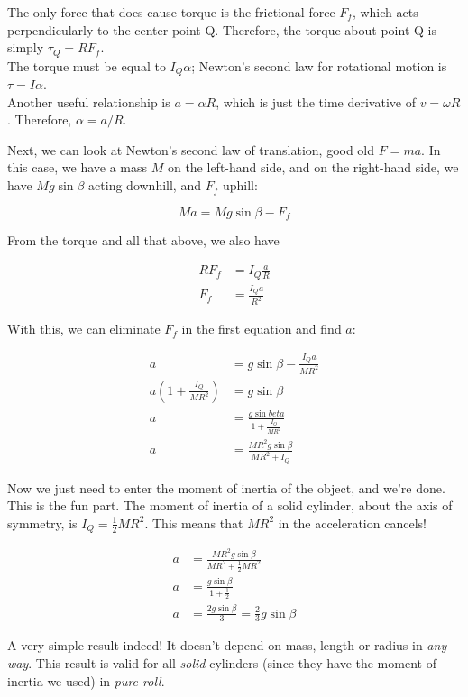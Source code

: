 The only force that does cause torque is the frictional force $F_f$, which acts perpendicularly to the center point Q. Therefore, the torque about point Q is simply $\tau_Q = R F_f$.\\
The torque must be equal to $I_Q \alpha$; Newton's second law for rotational motion is $\tau = I \alpha$.\\
Another useful relationship is $a = \alpha R$, which is just the time derivative of $v = \omega R$. Therefore, $\alpha = a/R$.

Next, we can look at Newton's second law of translation, good old $F = m a$. In this case, we have a mass $M$ on the left-hand side, and on the right-hand side, we have $M g \sin \beta$ acting downhill, and $F_f$ uphill:

\begin{equation}
M a = M g \sin \beta - F_f
\end{equation}

From the torque and all that above, we also have

\begin{align}
R F_f &= I_Q \frac{a}{R}\\
F_f &= \frac{I_Q a}{R^2}
\end{align}

With this, we can eliminate $F_f$ in the first equation and find $a$:

\begin{align}
a &= g \sin \beta - \frac{I_Q a}{M R^2}\\
a \left(1 + \frac{I_Q}{M R^2}\right) &= g \sin \beta\\
a &= \frac{g \sin beta}{1 + \frac{I_Q}{M R^2}}\\
a &= \frac{M R^2 g \sin \beta}{M R^2 + I_Q}
\end{align}

Now we just need to enter the moment of inertia of the object, and we're done. This is the fun part. The moment of inertia of a solid cylinder, about the axis of symmetry, is $I_Q = \frac{1}{2} M R^2$. This means that $M R^2$ in the acceleration cancels!

\begin{align}
a &= \frac{M R^2 g \sin \beta}{M R^2 + \frac{1}{2} M R^2}\\
a &= \frac{g \sin \beta}{1 + \frac{1}{2}}\\
a &= \frac{2 g \sin \beta}{3} = \frac{2}{3} g \sin \beta
\end{align}

A very simple result indeed! It doesn't depend on mass, length or radius in \emph{any way}. This result is valid for all \emph{solid} cylinders (since they have the moment of inertia we used) in \emph{pure roll}.

